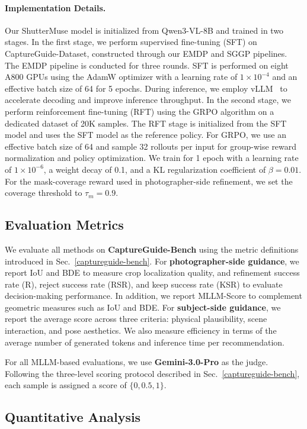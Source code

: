 \documentclass{llmxive}
\begin{document}
\paragraph{Implementation Details.}
Our ShutterMuse model is initialized from Qwen3-VL-8B and trained in two stages.
In the first stage, we perform supervised fine-tuning (SFT) on CaptureGuide-Dataset, constructed through our EMDP and SGGP pipelines. The EMDP pipeline is conducted for three rounds. SFT is performed on eight A800 GPUs using the AdamW optimizer with a learning rate of $1\times10^{-4}$ and an effective batch size of 64 for 5 epochs. During inference, we employ vLLM~\citep{kwon2023efficient} to accelerate decoding and improve inference throughput. In the second stage, we perform reinforcement fine-tuning (RFT) using the GRPO algorithm on a dedicated dataset of 20K samples. The RFT stage is initialized from the SFT model and uses the SFT model as the reference policy. For GRPO, we use an effective batch size of 64 and sample 32 rollouts per input for group-wise reward normalization and policy optimization. We train for 1 epoch with a learning rate of $1\times10^{-6}$, a weight decay of 0.1, and a KL regularization coefficient of $\beta=0.01$. For the mask-coverage reward used in photographer-side refinement, we set the coverage threshold to $\tau_m=0.9$.
\subsection{Evaluation Metrics}
We evaluate all methods on \textbf{CaptureGuide-Bench} using the metric definitions introduced in Sec.~\ref{captureguide-bench}. For \textbf{photographer-side guidance}, we report IoU and BDE to measure crop localization quality, and refinement success rate (R), reject success rate (RSR), and keep success rate (KSR) to evaluate decision-making performance. In addition, we report MLLM-Score to complement geometric measures such as IoU and BDE. For \textbf{subject-side guidance}, we report the average score across three criteria: physical plausibility, scene interaction, and pose aesthetics. We also measure efficiency in terms of the average number of generated tokens and inference time per recommendation.

For all MLLM-based evaluations, we use \textbf{Gemini-3.0-Pro} as the judge. Following the three-level scoring protocol described in Sec.~\ref{captureguide-bench}, each sample is assigned a score of $\{0, 0.5, 1\}$.

\subsection{Quantitative Analysis}
\end{document}
